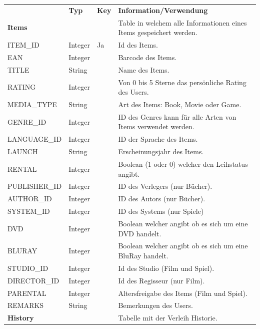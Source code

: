 \begin{longtable}{|l|l|l|l|}
	\rowcolor{black} {\color{white}\textbf{}} & {\color{white}\textbf{Typ}} & {\color{white}\textbf{Key}} & {\color{white}\textbf{Information/Verwendung}} \\
	\textbf{Items} & & & Table in welchem alle Informationen eines Items gespeichert werden. \\ \hline
	\rowcolor{DarkSeaGreen} ITEM\_ID & Integer & Ja & Id des Items. \\ \hline
	EAN & Integer & & Barcode des Items. \\ \hline
	\rowcolor{DarkSeaGreen} TITLE & String & & Name des Items. \\ \hline	
	RATING & Integer & & Von 0 bis 5 Sterne das persönliche Rating des Users. \\ \hline
	\rowcolor{DarkSeaGreen} MEDIA\_TYPE & String & & Art des Items: Book, Movie oder Game. \\ \hline
	GENRE\_ID & Integer &  & ID des Genres kann für alle Arten von Items verwendet werden. \\ \hline
	\rowcolor{DarkSeaGreen} LANGUAGE\_ID & Integer & & ID der Sprache des Items. \\ \hline
	LAUNCH & String & & Erscheinungsjahr des Items. \\ \hline
	\rowcolor{DarkSeaGreen} RENTAL & Integer & & Boolean (1 oder 0) welcher den Leihstatus angibt. \\ \hline
	PUBLISHER\_ID & Integer & & ID des Verlegers (nur Bücher). \\ \hline
	\rowcolor{DarkSeaGreen} AUTHOR\_ID & Integer & & ID des Autors (nur Bücher). \\ \hline
	SYSTEM\_ID & Integer & & ID des Systems (nur Spiele) \\ \hline
	\rowcolor{DarkSeaGreen} DVD & Integer & & Boolean welcher angibt ob es sich um eine DVD handelt. \\ \hline
	BLURAY & Integer & & Boolean welcher angibt ob es sich um eine BluRay handelt. \\ \hline
	\rowcolor{DarkSeaGreen} STUDIO\_ID & Integer & & Id des Studio (Film und Spiel). \\ \hline
	DIRECTOR\_ID & Integer & & Id des Regisseur (nur Film). \\ \hline
	\rowcolor{DarkSeaGreen} PARENTAL & Integer & & Altersfreigabe des Items (Film und Spiel). \\ \hline
	REMARKS & String & & Bemerkungen des Users. \\ \hline
	\rowcolor{DarkSeaGreen} \textbf{History} & & & Tabelle mit der Verleih Historie. \\ \hline

\end{longtable}
